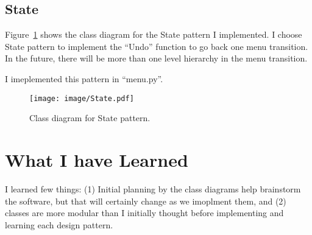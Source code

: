 \documentclass[11pt]{article}
\begin{document}
\subsection{State}
Figure~\ref{fig:state} shows the class diagram for the State pattern I implemented. 
I choose State pattern to implement the ``Undo'' function to go back one menu transition. 
In the future, there will be more than one level hierarchy in the menu transition. 

I imeplemented this pattern in ``menu.py''.

\begin{figure}[htb]
 \centering
     {\texttt{[image: image/State.pdf]}}
    \vspace{-2ex}
     \caption{\label{fig:state}  
        Class diagram for State pattern.
     }
\end{figure}


\section{What I have Learned}
I learned few things: (1) Initial planning by the class diagrams help brainstorm the software, but that will certainly change as we imoplment them, and (2) classes are more modular than I initially thought before implementing and learning each design pattern. 
\end{document}
